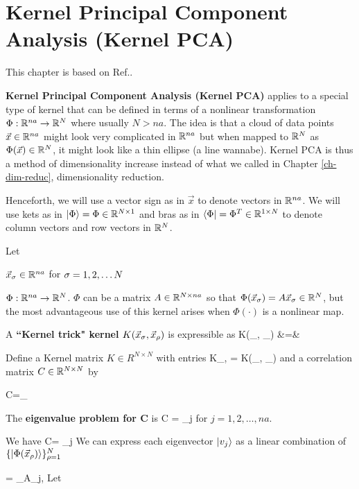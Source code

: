 \chapter{Kernel Principal Component Analysis (Kernel PCA)}
\label{ch-kernel-pca}

This chapter is based on Ref.\cite{wiki-kernel-pca}.

{\bf Kernel Principal Component Analysis (Kernel PCA)} applies
to a special type
of kernel that can be defined in terms of
a nonlinear transformation $\Phi:{ \mathbb{R}}^{na}\rightarrow { \mathbb{R}}^{N}$
where usually $N>na$. The idea is that a cloud of data points 
$\vec{x}\in{ \mathbb{R}}^{na}$ might look very complicated 
in ${ \mathbb{R}}^{na}$ but
when mapped to ${ \mathbb{R}}^N$ as $\Phi(\vec{x})\in{ \mathbb{R}}^N$, it might look like a thin ellipse (a line wannabe). Kernel PCA is thus a method of dimensionality increase instead of what
we called in Chapter \ref{ch-dim-reduc}, dimensionality
reduction.  

Henceforth, we will use a vector sign
as in $\vec{x}$ to denote 
vectors in ${ \mathbb{R}}^{na}$. We will use kets as in  $|\Phi\rangle=\Phi\in { \mathbb{R}}^{N\times 1}$ and bras as in $\langle\Phi|=\Phi^T\in { \mathbb{R}}^{1\times N}$ to denote  column vectors and row vectors in ${ \mathbb{R}}^N$.

Let

$\vec{x}_\sigma\in { \mathbb{R}}^{na}$ for  $\sigma=1,2,\ldots N$

$\Phi: { \mathbb{R}}^{na}\rightarrow { \mathbb{R}}^N$. $\Phi$ 
can be a matrix $A\in { \mathbb{R}}^{N\times na}$ so that $
\Phi (\vec{x}_\sigma)=A\vec{x}_\sigma\in{ \mathbb{R}}^N$,
but the most advantageous use of this
kernel arises when $\Phi(\cdot)$ is a nonlinear map.
 
A {\bf ``Kernel trick" kernel} $K(\vec{x}_\sigma, \vec{x}_{\rho})$ is expressible as 
\beqa
K(_\s, _{\rho}) &=& 
\eeqa

Define a Kernel matrix $K\in R^{N\times N}$ with entries
\beq
K_{\s, \rho} = K(_\s, _{\rho})
\eeq
and a correlation matrix $C\in { \mathbb{R}}^{N\times N}$ by

\beqa
C=\sum_\s 
{}
\eeqa

The {\bf eigenvalue problem for C} is
\beq
C  = \lam_j 
\eeq
for $j=1,2, \ldots, na$.


We have
\beq
{} C=
\lam_j
\eeq
We can express each eigenvector $|v_j\rangle$
as a linear combination of  
$\{|\Phi(\vec{x}_\rho)\rangle\}_{\rho=1}^N$


\beq
{} = \sum_\rho A_{j,\rho}
\eeq
Let

